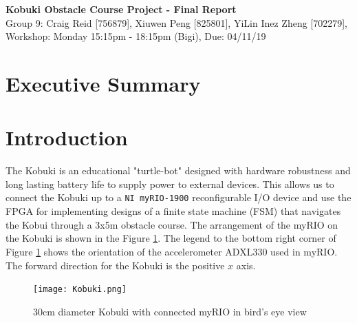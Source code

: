 \documentclass[11pt]{article}
\begin{document}

\clearpage
\setcounter{page}{1}

\begin{center}
\textbf{\Large{Kobuki Obstacle Course Project - Final Report}}\\
Group 9: Craig Reid [756879], Xiuwen Peng [825801], YiLin Inez Zheng [702279], \\
Workshop: Monday 15:15pm - 18:15pm (Bigi), Due: 04/11/19  
\end{center}

\tableofcontents

\section*{Executive Summary}

\newpage
\section{Introduction}
The Kobuki is an educational "turtle-bot" designed with hardware robustness and long lasting battery life to supply power to external devices. This allows us to connect the Kobuki up to a \texttt{NI myRIO-1900} reconfigurable I/O device and use the FPGA for implementing designs of a finite state machine (FSM) that navigates the Kobui through a 3x5m obstacle course. The arrangement of the myRIO on the Kobuki is shown in the Figure \ref{fig:kobuki}. The legend to the bottom right corner of Figure \ref{fig:kobuki} shows the orientation of the accelerometer ADXL330 used in myRIO. The forward direction for the Kobuki is the positive $x$ axis. 
\begin{figure}[H]
    \centering
    \texttt{[image: Kobuki.png]}
    \caption{30cm diameter Kobuki with connected myRIO in bird's eye view}
    \label{fig:kobuki}
\end{figure}
\end{document}

